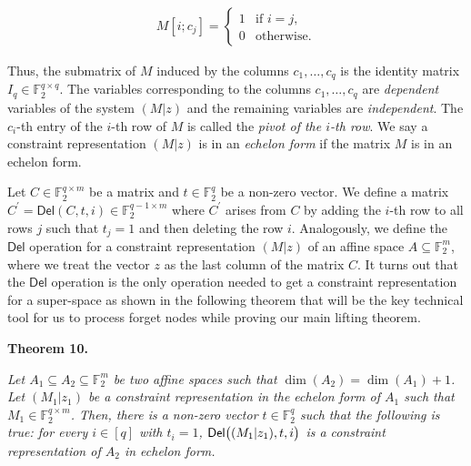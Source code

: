 \documentclass[10pt,a4paper]{article}
\begin{document}
\[\begin{gathered}
M[i;c_{j}]=\begin{cases}1&\text{if $i=j$},\\
0&\text{otherwise}.\end{cases}
\end{gathered}\]


Thus, the submatrix of $M$ induced by the columns $c_{1},\dots,c_{q}$ is the identity matrix $I_{q}\in\mathbb{F}_{2}^{q\times q}$.
The variables corresponding to the columns $c_{1},\dots,c_{q}$ are \emph{dependent} variables of the system $(M|z)$ and the remaining variables are \emph{independent}.
The $c_{i}$-th entry of the $i$-th row of $M$ is called the \emph{pivot of the $i$-th row}.
We say a constraint representation $(M|z)$ is in an \emph{echelon form} if the matrix $M$ is in an echelon form.\par




Let $C\in\mathbb{F}_{2}^{q\times m}$ be a matrix and $t\in\mathbb{F}_{2}^{q}$ be a non-zero vector.
We define a matrix $C^{\prime}=\mathsf{Del}(C,t,i)\in\mathbb{F}_{2}^{q-1\times m}$ where $C^{\prime}$ arises from $C$ by adding the $i$-th row to all rows $j$ such that $t_{j}=1$ and then deleting the row $i$.
Analogously, we define the $\mathsf{Del}$ operation for a constraint representation $(M|z)$ of an affine space $A\subseteq\mathbb{F}_{2}^{m}$, where we treat the vector $z$ as the last column of the matrix $C$.
It turns out that the $\mathsf{Del}$ operation is the only operation needed to get a constraint representation for a super-space as shown in the following theorem that will be the key technical tool for us to process forget nodes while proving our main lifting theorem.\par





\par\medskip\noindent\textbf{
\textbf{Theorem 10}\textbf{.}
}\par



\emph{Let $A_{1}\subseteq A_{2}\subseteq\mathbb{F}_{2}^{m}$ be two affine spaces such that $\dim(A_{2})=\dim(A_{1})+1$.
Let $(M_{1}|z_{1})$ be a constraint representation in the echelon form of $A_{1}$ such that $M_{1}\in\mathbb{F}_{2}^{q\times m}$.
Then, there is a non-zero vector $t\in\mathbb{F}_{2}^{q}$ such that the following is true: for every $i\in[q]$ with $t_{i}=1$, $\mathsf{Del}\bigl{(}(M_{1}|z_{1}),t,i\bigr{)}$ is a constraint representation of $A_{2}$ in echelon form.}\par
\end{document}

